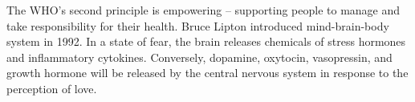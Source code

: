 \documentclass[jpm,article,submit,moreauthors,pdftex]{Definitions/mdpi}
\begin{document}
\begin{paracol}{2}
The WHO's second principle is empowering – supporting people to manage and take responsibility for their health.
Bruce Lipton introduced mind-brain-body system in 1992\cite{Mokhtari2011}\cite{Kobisi2012}\cite{Gustafson2017}.
In a state of fear, the brain releases chemicals of stress hormones and inflammatory cytokines.
Conversely, dopamine, oxytocin, vasopressin, and growth hormone will be released by the central nervous system in response to the perception of love.

\end{paracol}
\end{document}

